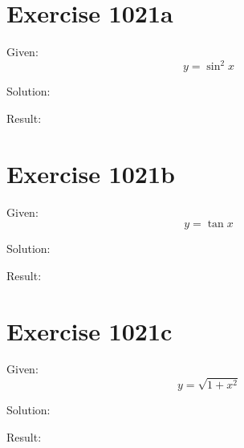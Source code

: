 \documentclass[a4paper, 10pt]{scrartcl}
\begin{document}
\section{Exercise 1021a}

Given:
\[
y = \sin^{2}{x}
\]

Solution:

Result:

\section{Exercise 1021b}

Given:
\[
y = \tan{x}
\]

Solution:

Result:

\section{Exercise 1021c}

Given:
\[
y = \sqrt{1 + x^{2}}
\]

Solution:

Result:
\end{document}

